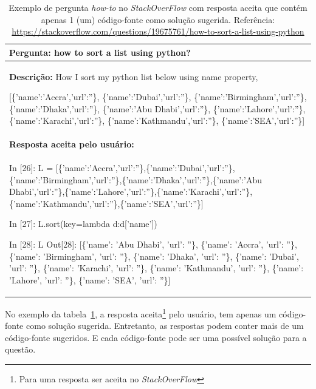 \begin{table}[h!]
\centering
\begin{tabular}{ |p{14cm}| } 
 \hline
 \textbf{Pergunta:} how to sort a list using python? \\ \hline
 \textbf{Descrição:} How I sort my python list below using name property,

 [\{'name':'Accra','url':''\},
  \{'name':'Dubai','url':''\},
  \{'name':'Birmingham','url':''\},
  \{'name':'Dhaka','url':''\},
  \{'name':'Abu Dhabi','url':''\},
  \{'name':'Lahore','url':''\},
  \{'name':'Karachi','url':''\},
  \{'name':'Kathmandu','url':''\},
  \{'name':'SEA','url':''\}]
 \\ \hline
 \textbf{Resposta aceita pelo usuário:}\\ 
 \hline
 In [26]: L = [\{'name':'Accra','url':''\},\{'name':'Dubai','url':''\},\newline\{'name':'Birmingham','url':''\},\{'name':'Dhaka','url':''\},\newline\{'name':'Abu Dhabi','url':''\},\{'name':'Lahore','url':''\},\newline\{'name':'Karachi','url':''\},\{'name':'Kathmandu','url':''\},\newline\{'name':'SEA','url':''\}]

In [27]: L.sort(key=lambda d:d['name'])

In [28]: L
Out[28]: 
[\{'name': 'Abu Dhabi', 'url': ''\},
 \{'name': 'Accra', 'url': ''\},
 \{'name': 'Birmingham', 'url': ''\},
 \{'name': 'Dhaka', 'url': ''\},
 \{'name': 'Dubai', 'url': ''\},
 \{'name': 'Karachi', 'url': ''\},
 \{'name': 'Kathmandu', 'url': ''\},
 \{'name': 'Lahore', 'url': ''\},
 \{'name': 'SEA', 'url': ''\}]\\ 
 \hline
\end{tabular}
\caption{Exemplo de pergunta \textit{how-to} no \textit{StackOverFlow} com resposta aceita que contém apenas 1 (um) código-fonte como solução sugerida. Referência: \url{https://stackoverflow.com/questions/19675761/how-to-sort-a-list-using-python}}
\label{table:exemplo-pergunta-stack-over-flow-howto}
\end{table}


No exemplo da tabela~\ref{table:exemplo-pergunta-stack-over-flow-howto}, a resposta aceita\footnote{Para uma resposta ser aceita no \textit{StackOverFlow}} pelo usuário, tem apenas um código-fonte como solução sugerida. Entretanto, as respostas podem conter mais de um código-fonte sugeridos. E cada código-fonte pode ser uma possível solução para a questão.

